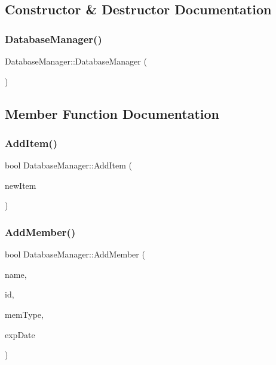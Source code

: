 \subsection{Constructor \& Destructor Documentation}
\mbox{\label{class_database_manager_aefa3d6eae7782904f5d758462b573b1e}} 
\subsubsection{\texorpdfstring{Database\+Manager()}{DatabaseManager()}}
{\footnotesize\ttfamily Database\+Manager\+::\+Database\+Manager (\begin{DoxyParamCaption}\item[{const \hyperlink{class_database_manager}{Database\+Manager} \&}]{ }\end{DoxyParamCaption})\hspace{0.3cm}{\ttfamily [delete]}}



\subsection{Member Function Documentation}
\mbox{\label{class_database_manager_a1b647f6b2904740102c6b00ab72c5843}} 
\subsubsection{\texorpdfstring{Add\+Item()}{AddItem()}}
{\footnotesize\ttfamily bool Database\+Manager\+::\+Add\+Item (\begin{DoxyParamCaption}\item[{const \hyperlink{class_item}{Item} \&}]{new\+Item }\end{DoxyParamCaption})}

\mbox{\label{class_database_manager_add7d1cba7d8a7ad3e75f241d1195e7a3}} 
\subsubsection{\texorpdfstring{Add\+Member()}{AddMember()}}
{\footnotesize\ttfamily bool Database\+Manager\+::\+Add\+Member (\begin{DoxyParamCaption}\item[{Q\+String}]{name,  }\item[{int}]{id,  }\item[{Q\+String}]{mem\+Type,  }\item[{Q\+String}]{exp\+Date }\end{DoxyParamCaption})}


